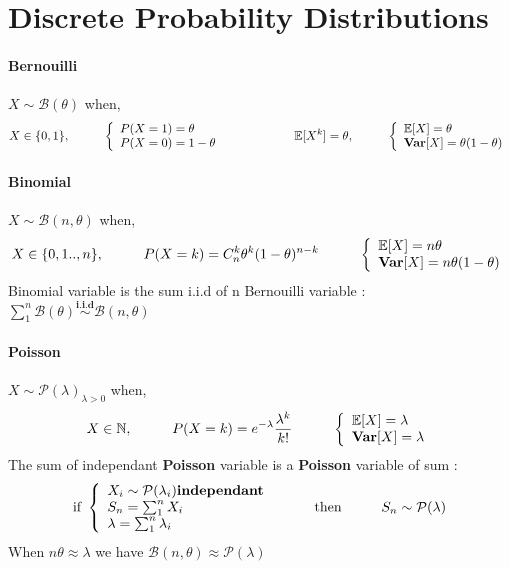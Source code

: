 \documentclass[a4paper,10pt]{article}
\begin{document}
\section{Discrete Probability Distributions}

\paragraph{Bernouilli} $X\sim \mathcal{B}(\theta)$ when, 
\[
X \in \{0,1\} , 
\hspace{10mm}
\left\{
\begin{array}{l}
P(X=1)=\theta \\
P(X=0)=1-\theta
\end{array}\right.
\hspace{20mm}
\mathbb{E}[X^k]=\theta,
\hspace{10mm}
\left\{
\begin{array}{l}
\mathbb{E}[X]=\theta \\
\textbf{Var}[X]=\theta (1-\theta)
\end{array}\right.
\]

\paragraph{Binomial} $X\sim \mathcal{B}(n,\theta)$ when,
\[
X \in \{0,1 .. , n\} , 
\hspace{10mm}
P(X=k)=C^k_n\theta ^k (1-\theta)^{n-k} 
\hspace{10mm}
\left\{
\begin{array}{l}
\mathbb{E}[X]=n\theta \\
\textbf{Var}[X]=n \theta (1-\theta) 
\end{array}\right.
\]
Binomial variable is the sum i.i.d of n Bernouilli variable : $\sum_1^n \mathcal{B}(\theta) \stackrel{\textbf{i.i.d}}{\sim}  \mathcal{B}(n,\theta) $

\paragraph{Poisson} $X\sim \mathcal{P}(\lambda)_{\lambda>0}$ when,
\[
X \in \mathbb{N} , 
\hspace{10mm}
P(X=k)= e^{-\lambda}\frac{\lambda^k}{k!}
\hspace{10mm}
\left\{
\begin{array}{l}
\mathbb{E}[X]=\lambda \\
\textbf{Var}[X]=\lambda
\end{array}\right.
\]
The sum of independant \textbf{Poisson} variable is a \textbf{Poisson} variable of sum :
\[
\text{if  } 
\left\{
\begin{array}{l}
X_i \sim \mathcal{P}(\lambda_i) \textbf{independant} \\
S_n = \sum_{1}^{n} X_i \\
\lambda = \sum_{1}^{n} \lambda_i
\end{array}\right.
\hspace{10mm} \text{then} \hspace{10mm}
S_n \sim \mathcal{P}(\lambda)
\]
When $n\theta \approx \lambda$ we have $\mathcal{B}(n,\theta) \approx \mathcal{P}(\lambda)$
\end{document}
